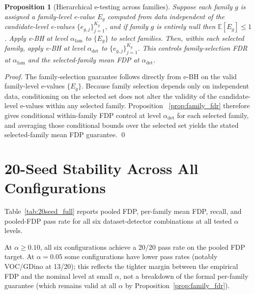 \documentclass{article}
\newtheorem{proposition}{Proposition}
\theoremstyle{remark}
\newcommand{\E}{\mathbb{E}}
\newcommand{\1}{\mathbf{1}}
\begin{document}
\begin{proposition}[Hierarchical e-testing across families]
\label{prop:hierarchical_ebh}
Suppose each family $g$ is assigned a family-level e-value $E_g$ computed from
data independent of the candidate-level e-values $\{e_{g,j}\}_{j=1}^{K_g}$,
and if family $g$ is entirely null then $\E[E_g]\le 1$. Apply e-BH at level
$\alpha_{\mathrm{fam}}$ to $\{E_g\}$ to select families. Then, within each
selected family, apply e-BH at level $\alpha_{\mathrm{det}}$ to
$\{e_{g,j}\}_{j=1}^{K_g}$. This controls family-selection FDR at
$\alpha_{\mathrm{fam}}$ and the selected-family mean FDP at
$\alpha_{\mathrm{det}}$.
\end{proposition}

\begin{proof}
The family-selection guarantee follows directly from e-BH on the valid
family-level e-values $\{E_g\}$. Because family selection depends only on
independent data, conditioning on the selected set does not alter the validity
of the candidate-level e-values within any selected family. Proposition
~\ref{prop:family_fdr} therefore gives conditional within-family FDP control at
level $\alpha_{\mathrm{det}}$ for each selected family, and averaging those
conditional bounds over the selected set yields the stated selected-family mean
FDP guarantee. \qed
\end{proof}

\section{20-Seed Stability Across All Configurations}
\label{app:20seed}

Table~\ref{tab:20seed_full} reports pooled FDP, per-family mean FDP, recall,
and pooled-FDP pass rate for all six dataset-detector combinations at all
tested $\alpha$ levels.

At $\alpha\ge0.10$, all six configurations achieve a 20/20 pass rate on the
pooled FDP target. At $\alpha=0.05$ some configurations have lower pass rates
(notably VOC/GDino at 13/20); this reflects the tighter margin between the
empirical FDP and the nominal level at small $\alpha$, not a breakdown of the
formal per-family guarantee (which remains valid at all $\alpha$ by
Proposition~\ref{prop:family_fdr}).
\end{document}
